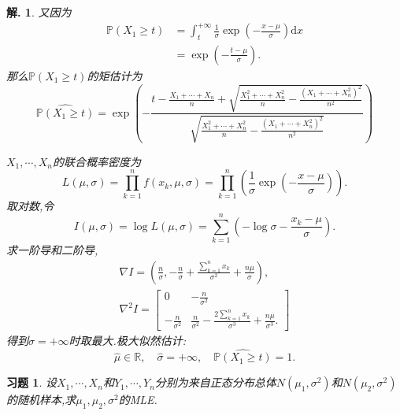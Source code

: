 \documentclass[a4paper,oneside,12pt]{ctexart}
\theoremstyle{plain}
\newtheorem{exercise}{习题}
\theoremstyle{nonumberplain}
\newtheorem{solution}{解.}
\theoremstyle{nonumberplain}
\newcommand{\dif}{\mathrm{d}}
\newcommand{\R}{\mathbb{R}}
\newcommand{\prob}{\mathbb{P}}
\begin{document}
\begin{solution}
        又因为
        \begin{align*}
            \prob(X_1\geqslant t)&=\int_t^{+\infty}\frac{1}{\sigma}\exp\left(-\frac{x-\mu}{\sigma}\right)\dif x\\
            &=\exp\left(-\frac{t-\mu}{\sigma}\right).
        \end{align*}
        那么$\prob(X_1\geqslant t)$的矩估计为 
        \begin{equation*}
            \widehat{\prob(X_1\geqslant t)}=\exp\left(-\frac{t-\frac{X_1+\cdots+X_n}{n}+\sqrt{\frac{X_1^2+\cdots+X_n^2}{n}-\frac{(X_1+\cdots+X_n^2)^2}{n^2}}}{\sqrt{\frac{X_1^2+\cdots+X_n^2}{n}-\frac{(X_1+\cdots+X_n^2)^2}{n^2}}}\right)
        \end{equation*}

        $X_1,\cdots,X_n$的联合概率密度为 
        \begin{equation*}
            L(\mu,\sigma)=\prod_{k=1}^nf(x_k,\mu,\sigma)=\prod_{k=1}^n\left(\frac{1}{\sigma}\exp\left(-\frac{x-\mu}{\sigma}\right)\right).
        \end{equation*}
        取对数,令 
        \begin{equation*}
            I(\mu,\sigma)=\log L(\mu,\sigma)=\sum_{k=1}^n\left(-\log\sigma-\frac{x_k-\mu}{\sigma}\right).
        \end{equation*}
        求一阶导和二阶导,
        \begin{gather*}
            \nabla I=\left(\frac{n}{\sigma},-\frac{n}{\sigma}+\frac{\sum_{k=1}^nx_k}{\sigma^2}+\frac{n\mu}{\sigma}\right),\\
            \nabla^2 I=\begin{bmatrix}
                0 & -\frac{n}{\sigma^2}\\
                -\frac{n}{\sigma^2} & \frac{n}{\sigma^2}-\frac{2\sum_{k=1}^nx_k}{\sigma^3}+\frac{n\mu}{\sigma^3}.
            \end{bmatrix}
        \end{gather*}
        得到$\sigma=+\infty$时取最大.极大似然估计:
        \begin{equation*}
            \hat{\mu}\in\R,\quad \hat{\sigma}=+\infty,\quad \widehat{\prob(X_1\geqslant t)}=1.
        \end{equation*}
    \end{solution}

    \begin{exercise}
        \label{ex:3}
        设$X_1,\cdots,X_n$和$Y_1,\cdots,Y_n$分别为来自正态分布总体$N(\mu_1,\sigma^2)$和$N(\mu_2,\sigma^2)$的随机样本,求$\mu_1,\mu_2,\sigma^2$的MLE.
    \end{exercise}
\end{document}
